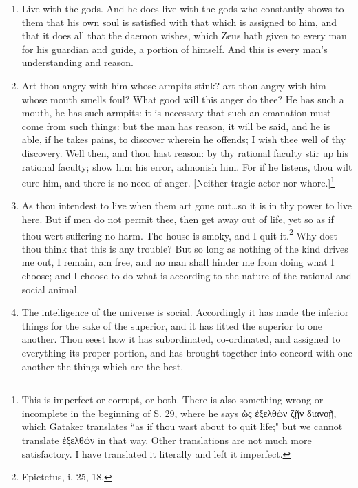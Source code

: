\begin{enumerate}
\item Live with the gods. And he does live with the gods who constantly shows to them that his own soul is satisfied with that which is assigned to him, and that it does all that the daemon wishes, which Zeus hath given to every man for his guardian and guide, a portion of himself. And this is every man's understanding and reason.

\item Art thou angry with him whose armpits stink? art thou angry with him whose mouth smells foul? What good will this anger do thee? He has such a mouth, he has such armpits: it is necessary that such an emanation must come from such things: but the man has reason, it will be said, and he is able, if he takes pains, to discover wherein he offends; I wish thee well of thy discovery. Well then, and thou hast reason: by thy rational faculty stir up his rational faculty; show him his error, admonish him. For if he listens, thou wilt cure him, and there is no need of anger. [{\clarify Neither tragic actor nor whore.}]\footnote{This is imperfect or corrupt, or both. There is also something wrong or incomplete in the beginning of S. 29, where he says \textgreek{ὠς ἐξελθὼν ζῇν διανοῇ}, which Gataker translates ``as if thou wast about to quit life;" but we cannot translate \textgreek{ἐξελθών} in that way. Other translations are not much more satisfactory. I have translated it literally and left it imperfect.}

\item As thou intendest to live when them art gone out\ldots so it is in thy power to live here. But if men do not permit thee, then get away out of life, yet so as if thou wert suffering no harm. The house is smoky, and I quit it.\footnote{Epictetus, i. 25, 18.} Why dost thou think that this is any trouble? But so long as nothing of the kind drives me out, I remain, am free, and no man shall hinder me from doing what I choose; and I choose to do what is according to the nature of the rational and social animal.

\item The intelligence of the universe is social. Accordingly it has made the inferior things for the sake of the superior, and it has fitted the superior to one another. Thou seest how it has subordinated, co-ordinated, and assigned to everything its proper portion, and has brought together into concord with one another the things which are the best.


\end{enumerate}
